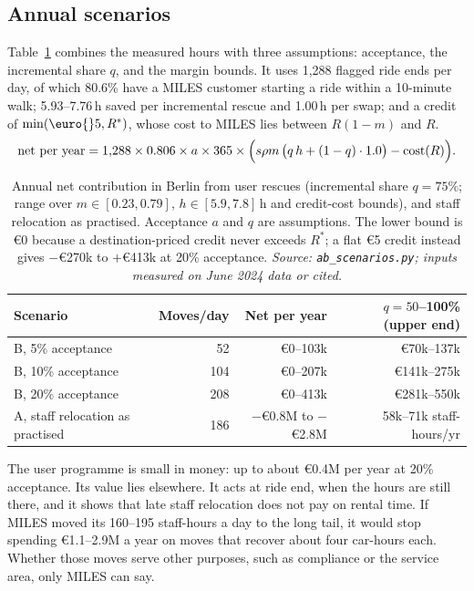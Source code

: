 \documentclass[11pt,a4paper]{article}
\newcommand{\eur}[1]{\euro{}#1}
\begin{document}
\subsection{Annual scenarios}\label{sec:econ}

Table~\ref{tab:econ} combines the measured hours with three assumptions: acceptance, the incremental share $q$, and the margin bounds. It uses 1{,}288 flagged ride ends per day, of which 80.6\% have a MILES customer starting a ride within a 10-minute walk; 5.93--7.76\,h saved per incremental rescue and 1.00\,h per swap; and a credit of $\min(\text{\eur{5}}, R^\ast)$, whose cost to MILES lies between $R(1-m)$ and $R$.
\begin{equation}
\text{net per year} = 1{,}288 \times 0.806 \times a \times 365 \times \Bigl(s\rho m\,\bigl(q\,h+(1-q)\cdot 1.0\bigr)-\mathrm{cost}(R)\Bigr).
\end{equation}

\begin{table}[h]
\centering\small
\caption{Annual net contribution in Berlin from user rescues (incremental share $q=75\%$; range over $m\in[0.23,0.79]$, $h\in[5.9,7.8]$\,h and credit-cost bounds), and staff relocation as practised. Acceptance $a$ and $q$ are assumptions. The lower bound is \eur{0} because a destination-priced credit never exceeds $R^\ast$; a flat \eur{5} credit instead gives $-$\eur{270k} to $+$\eur{413k} at 20\% acceptance. \emph{Source: \texttt{ab\_scenarios.py}; inputs measured on June 2024 data or cited.}}
\label{tab:econ}
\begin{tabular}{@{}lrrr@{}}
\toprule
Scenario & Moves/day & Net per year & $q=50$--100\% (upper end) \\
\midrule
B, 5\% acceptance & 52 & \eur{0}--103k & \eur{70k}--137k \\
B, 10\% acceptance & 104 & \eur{0}--207k & \eur{141k}--275k \\
B, 20\% acceptance & 208 & \eur{0}--413k & \eur{281k}--550k \\
A, staff relocation as practised & 186 & $-$\eur{0.8M} to $-$\eur{2.8M} & 58k--71k staff-hours/yr \\
\bottomrule
\end{tabular}
\end{table}

The user programme is small in money: up to about \eur{0.4M} per year at 20\% acceptance. Its value lies elsewhere. It acts at ride end, when the hours are still there, and it shows that late staff relocation does not pay on rental time. If MILES moved its 160--195 staff-hours a day to the long tail, it would stop spending \eur{1.1}--2.9M a year on moves that recover about four car-hours each. Whether those moves serve other purposes, such as compliance or the service area, only MILES can say.
\end{document}
